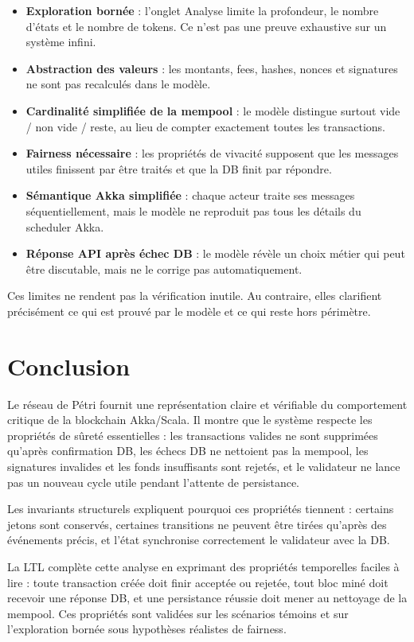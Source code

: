 \documentclass[11pt,a4paper]{article}
\newcommand{\code}[1]{\ifmmode\text{\ttfamily\footnotesize\detokenize{#1}}\else{\ttfamily\footnotesize\detokenize{#1}}\fi}
\begin{document}
\begin{itemize}
  \item \textbf{Exploration bornée} : l'onglet Analyse limite la profondeur, le nombre d'états et le nombre de tokens. Ce n'est pas une preuve exhaustive sur un système infini.
  \item \textbf{Abstraction des valeurs} : les montants, fees, hashes, nonces et signatures ne sont pas recalculés dans le modèle.
  \item \textbf{Cardinalité simplifiée de la mempool} : le modèle distingue surtout vide / non vide / reste, au lieu de compter exactement toutes les transactions.
  \item \textbf{Fairness nécessaire} : les propriétés de vivacité supposent que les messages utiles finissent par être traités et que la DB finit par répondre.
  \item \textbf{Sémantique Akka simplifiée} : chaque acteur traite ses messages séquentiellement, mais le modèle ne reproduit pas tous les détails du scheduler Akka.
  \item \textbf{Réponse API après échec DB} : le modèle révèle un choix métier qui peut être discutable, mais ne le corrige pas automatiquement.
\end{itemize}

Ces limites ne rendent pas la vérification inutile. Au contraire, elles clarifient précisément ce qui est prouvé par le modèle et ce qui reste hors périmètre.

\section{Conclusion}

Le réseau de Pétri fournit une représentation claire et vérifiable du comportement critique de la blockchain Akka/Scala. Il montre que le système respecte les propriétés de sûreté essentielles : les transactions valides ne sont supprimées qu'après confirmation DB, les échecs DB ne nettoient pas la mempool, les signatures invalides et les fonds insuffisants sont rejetés, et le validateur ne lance pas un nouveau cycle utile pendant l'attente de persistance.

Les invariants structurels expliquent pourquoi ces propriétés tiennent : certains jetons sont conservés, certaines transitions ne peuvent être tirées qu'après des événements précis, et l'état \code{waitingForDbState} synchronise correctement le validateur avec la DB.

La LTL complète cette analyse en exprimant des propriétés temporelles faciles à lire : toute transaction créée doit finir acceptée ou rejetée, tout bloc miné doit recevoir une réponse DB, et une persistance réussie doit mener au nettoyage de la mempool. Ces propriétés sont validées sur les scénarios témoins et sur l'exploration bornée sous hypothèses réalistes de fairness.
\end{document}
